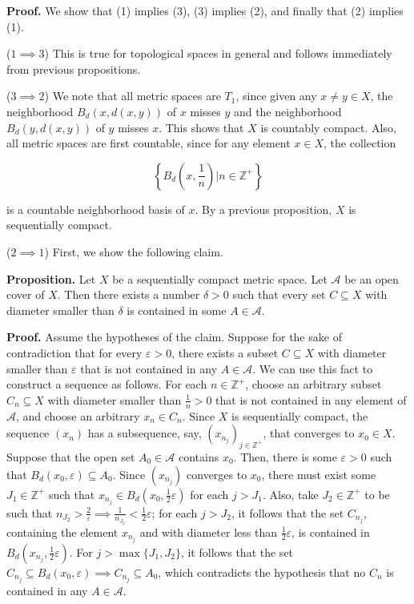 \documentclass[12pt]{article}
\begin{document}
\textbf{Proof. } We show that (1) implies (3), (3) implies (2), and finally that (2) implies (1).

($1 \implies 3$) This is true for topological spaces in general and follows immediately from previous propositions.

($3 \implies 2$) We note that all metric spaces are $T_1$, since given any $x \ne y \in X$, the neighborhood $B_d (x, d (x, y))$ of $x$ misses $y$ and the neighborhood $B_d (y, d (x, y))$ of $y$ misses $x$. This shows that $X$ is countably compact. Also, all metric spaces are first countable, since for any element $x \in X$, the collection

$$\left\{ B_d \left( x, \frac{1}{n} \right) \big| n \in \mathbb{Z}^+ \right\}$$

is a countable neighborhood basis of $x$. By a previous proposition, $X$ is sequentially compact.

($2 \implies 1$) First, we show the following claim.

\textbf{Proposition. } Let $X$ be a sequentially compact metric space. Let $\mathcal{A}$ be an open cover of $X$. Then there exists a number $\delta > 0$ such that every set $C \subseteq X$ with diameter smaller than $\delta$ is contained in some $A \in \mathcal{A}$.

\textbf{Proof. } Assume the hypotheses of the claim. Suppose for the sake of contradiction that for every $\varepsilon > 0$, there exists a subset $C \subseteq X$ with diameter smaller than $\varepsilon$ that is not contained in any $A \in \mathcal{A}$. We can use this fact to construct a sequence as follows. For each $n \in \mathbb{Z}^+$, choose an arbitrary subset $C_n \subseteq X$ with diameter smaller than $\frac{1}{n} > 0$ that is not contained in any element of $\mathcal{A}$, and choose an arbitrary $x_n \in C_n$. Since $X$ is sequentially compact, the sequence $(x_n)$ has a subsequence, say, $(x_{n_j})_{j \in \mathbb{Z}^+}$, that converges to $x_0 \in X$. Suppose that the open set $A_0 \in \mathcal{A}$ contains $x_0$. Then, there is some $\varepsilon > 0$ such that $B_d (x_0, \varepsilon) \subseteq A_0$. Since $(x_{n_j})$ converges to $x_0$, there must exist some $J_1 \in \mathbb{Z}^+$ such that $x_{n_j} \in B_d \left( x_0, \frac{1}{2} \varepsilon \right)$ for each $j > J_1$. Also, take $J_2 \in \mathbb{Z}^+$ to be such that $n_{J_2} > \frac{2}{\varepsilon} \implies \frac{1}{n_{J_2}} < \frac{1}{2} \varepsilon$; for each $j > J_2$, it follows that the set $C_{n_j}$, containing the element $x_{n_j}$ and with diameter less than $\frac{1}{2} \varepsilon$, is contained in $B_d \left( x_{n_j}, \frac{1}{2} \varepsilon \right)$. For $j > \max \{ J_1, J_2 \}$, it follows that the set $C_{n_j} \subseteq B_d (x_0, \varepsilon) \implies C_{n_j} \subseteq A_0$, which contradicts the hypothesis that no $C_n$ is contained in any $A \in \mathcal{A}$.
\end{document}
